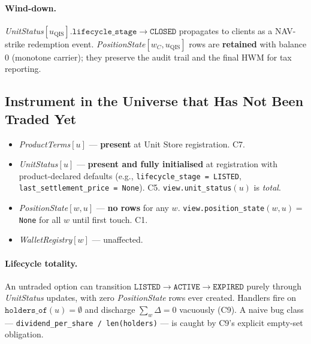 \documentclass[11pt,a4paper]{article}
\begin{document}
\paragraph{Wind-down.} \textit{UnitStatus}$[u_{\mathrm{QIS}}].\texttt{lifecycle\_stage} \to \texttt{CLOSED}$ propagates to clients as a NAV-strike redemption event. \textit{PositionState}$[w_C, u_{\mathrm{QIS}}]$ rows are \textbf{retained} with balance 0 (monotone carrier); they preserve the audit trail and the final HWM for tax reporting.

\subsection{Instrument in the Universe that Has Not Been Traded Yet}

\begin{itemize}[leftmargin=*]
\item \textit{ProductTerms}$[u]$ --- \textbf{present} at Unit Store registration. C7.
\item \textit{UnitStatus}$[u]$ --- \textbf{present and fully initialised} at registration with product-declared defaults (e.g., \texttt{lifecycle\_stage = LISTED}, \texttt{last\_settlement\_price = None}). C5. \texttt{view.unit\_status}$(u)$ is \emph{total}.
\item \textit{PositionState}$[w, u]$ --- \textbf{no rows} for any $w$. \texttt{view.position\_state}$(w, u) = $ \texttt{None} for all $w$ until first touch. C1.
\item \textit{WalletRegistry}$[w]$ --- unaffected.
\end{itemize}

\paragraph{Lifecycle totality.} An untraded option can transition $\texttt{LISTED} \to \texttt{ACTIVE} \to \texttt{EXPIRED}$ purely through \textit{UnitStatus} updates, with zero \textit{PositionState} rows ever created. Handlers fire on $\texttt{holders\_of}(u) = \emptyset$ and discharge $\sum_w \Delta = 0$ vacuously (C9). A naive bug class --- \texttt{dividend\_per\_share / len(holders)} --- is caught by C9's explicit empty-set obligation.
\end{document}
